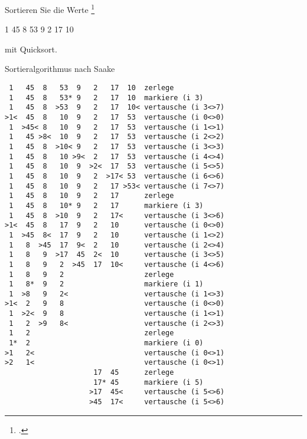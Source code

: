 \documentclass{bschlangaul-aufgabe}
\begin{document}

Sortieren Sie die Werte
\footcite{examen:66115:2016:03}

\begin{center}
1 45 8 53 9 2 17 10
\end{center}

mit Quicksort.

\begin{bAntwort}
Sortieralgorithmus nach Saake
\begin{verbatim}
 1   45  8   53  9   2   17  10  zerlege
 1   45  8   53* 9   2   17  10  markiere (i 3)
 1   45  8  >53  9   2   17  10< vertausche (i 3<>7)
>1<  45  8   10  9   2   17  53  vertausche (i 0<>0)
 1  >45< 8   10  9   2   17  53  vertausche (i 1<>1)
 1   45 >8<  10  9   2   17  53  vertausche (i 2<>2)
 1   45  8  >10< 9   2   17  53  vertausche (i 3<>3)
 1   45  8   10 >9<  2   17  53  vertausche (i 4<>4)
 1   45  8   10  9  >2<  17  53  vertausche (i 5<>5)
 1   45  8   10  9   2  >17< 53  vertausche (i 6<>6)
 1   45  8   10  9   2   17 >53< vertausche (i 7<>7)
 1   45  8   10  9   2   17      zerlege
 1   45  8   10* 9   2   17      markiere (i 3)
 1   45  8  >10  9   2   17<     vertausche (i 3<>6)
>1<  45  8   17  9   2   10      vertausche (i 0<>0)
 1  >45  8<  17  9   2   10      vertausche (i 1<>2)
 1   8  >45  17  9<  2   10      vertausche (i 2<>4)
 1   8   9  >17  45  2<  10      vertausche (i 3<>5)
 1   8   9   2  >45  17  10<     vertausche (i 4<>6)
 1   8   9   2                   zerlege
 1   8*  9   2                   markiere (i 1)
 1  >8   9   2<                  vertausche (i 1<>3)
>1<  2   9   8                   vertausche (i 0<>0)
 1  >2<  9   8                   vertausche (i 1<>1)
 1   2  >9   8<                  vertausche (i 2<>3)
 1   2                           zerlege
 1*  2                           markiere (i 0)
>1   2<                          vertausche (i 0<>1)
>2   1<                          vertausche (i 0<>1)
                     17  45      zerlege
                     17* 45      markiere (i 5)
                    >17  45<     vertausche (i 5<>6)
                    >45  17<     vertausche (i 5<>6)
\end{verbatim}


\end{bAntwort}
\end{document}
